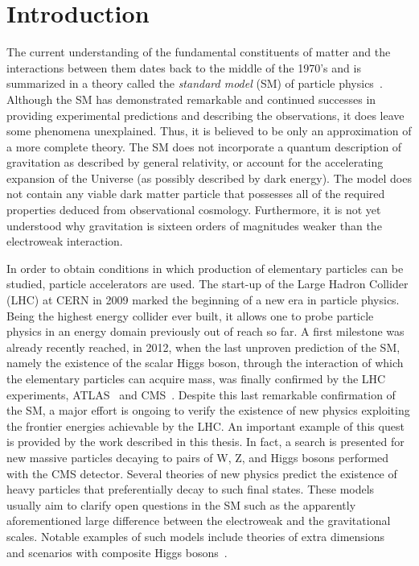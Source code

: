 \chapter{Introduction}
\label{ch:Introduction}

The current understanding of the fundamental constituents of matter and the interactions between them
dates back to the middle of the 1970's and is summarized in a theory called the \textit{standard model} (SM) of particle physics~\cite{QFTbook}. 
Although the SM has demonstrated remarkable and continued successes in providing experimental predictions and describing the observations, 
it does leave some phenomena unexplained. Thus, it is believed to be only an approximation of a more complete theory.
The SM does not incorporate a quantum description of gravitation as described by general relativity,
or account for the accelerating expansion of the Universe (as possibly described by dark energy).
The model does not contain any viable dark matter particle that possesses all of the required properties deduced from observational cosmology.
Furthermore, it is not yet understood why gravitation is sixteen orders of magnitudes weaker than the electroweak interaction. 

In order to obtain conditions in which production of elementary particles can be studied, particle accelerators are used.
The start-up of the Large Hadron Collider (LHC) at CERN in 2009 marked the beginning of a new era in particle physics.
Being the highest energy collider ever built, it allows one to probe particle physics in an energy domain previously out of reach so far.
A first milestone was already recently reached, in 2012, when the last unproven prediction of the SM, namely the existence of the scalar Higgs boson, through the interaction of which the elementary particles can acquire mass,
was finally confirmed by the LHC experiments, ATLAS~\cite{Aad:2012tfa} and CMS~\cite{Chatrchyan:2013lba}.
Despite this last remarkable confirmation of the SM, a major effort is ongoing to verify the existence of new physics exploiting the frontier energies achievable by the LHC.
An important example of this quest is provided by the work described in this thesis. In fact, a search is presented for new massive particles decaying to pairs of W, Z, and Higgs bosons performed with the CMS detector.
Several theories of new physics predict the existence of heavy particles that preferentially decay to such final states.
These models usually aim to clarify open questions in the SM such as the apparently aforementioned large difference between the electroweak and the gravitational scales.
Notable examples of such models include theories of extra dimensions~\cite{Randall:1999ee,Agashe:2007zd} and scenarios with composite Higgs bosons~\cite{Composite0,Composite1}.

